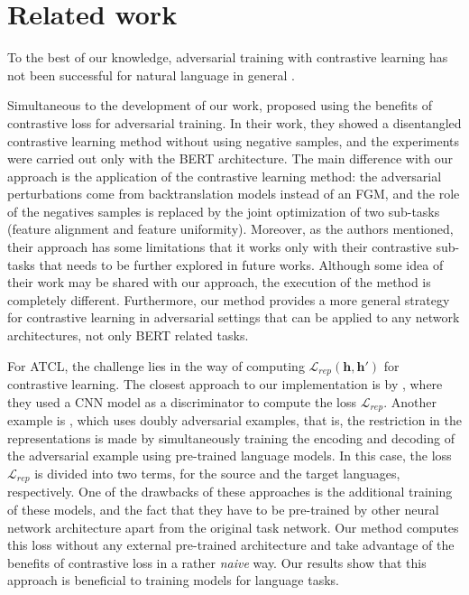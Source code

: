 \documentclass[letterpaper]{article} %
\begin{document}

\section{Related work}
To the best of our knowledge, adversarial training with contrastive learning has not been successful for natural language in general \cite{jaiswal2021survey}. 

Simultaneous to the development of our work, \cite{chen2021disentangled} proposed using the benefits of contrastive loss for adversarial training. In their work, they showed a disentangled contrastive learning method without using negative samples, and the experiments were carried out only with the BERT architecture. The main difference with our approach is the application of the contrastive learning method: the adversarial perturbations come from backtranslation models instead of an FGM, and the role of the negatives samples is replaced by the joint optimization of two sub-tasks (feature alignment and feature uniformity). Moreover, as the authors mentioned, their approach has some limitations that it works only with their contrastive sub-tasks that needs to be further explored in future works. Although some idea of their work may be shared with our approach, the execution of the method is completely different. Furthermore, our method provides a more general strategy for contrastive learning in adversarial settings that can be applied to any network architectures, not only BERT related tasks.

For ATCL, the challenge lies in the way of computing $\mathcal{L}_{rep}(\mathbf{h}, \mathbf{h'})$ for contrastive learning. The closest approach to our implementation is by \cite{cheng2018towards}, where they used a CNN model as a discriminator \cite{kim2014convolutional} to compute the loss $\mathcal{L}_{rep}$. Another example is \cite{cheng2019robust}, which uses doubly adversarial examples, that is, the restriction in the representations is made by simultaneously training the encoding and decoding of the adversarial example using pre-trained language models. In this case, the loss $\mathcal{L}_{rep}$ is divided into two terms, for the source and the target languages, respectively. One of the drawbacks of these approaches is the additional training of these models, and the fact that they have to be pre-trained by other neural network architecture apart from the original task network. Our method computes this loss without any external pre-trained architecture and take advantage of the benefits of contrastive loss in a rather \textit{naive} way. Our results show that this approach is beneficial to training models for language tasks.
\end{document}
